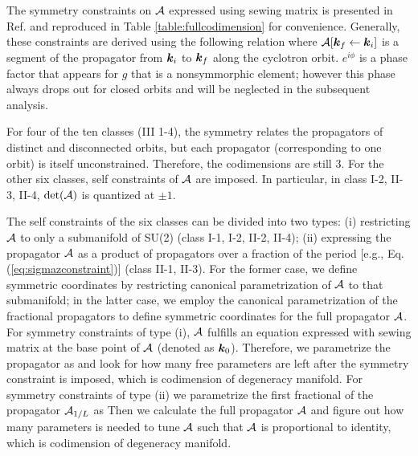 \documentclass[aps, showpacs, twocolumn, notitlepage, superscriptaddress]{revtex4-1}
\begin{document}
The symmetry constraints on ${\cal A}$ expressed using sewing matrix is presented in Ref.  and reproduced in Table \ref{table:fullcodimension} for convenience. Generally, these constraints are derived using the following relation
where ${\cal A}[\boldsymbol{k}_f\leftarrow \boldsymbol{k}_i]$ is a segment of the propagator from $\boldsymbol{k}_i$ to $\boldsymbol{k}_f$ along the cyclotron orbit. $e^{i\phi}$ is a phase factor that appears for $g$ that is a nonsymmorphic element; however this phase always drops out\cite{100p} for closed orbits and will be neglected in the subsequent analysis.

For four of  the ten classes (III 1-4), the symmetry relates the propagators of distinct and disconnected orbits, but each propagator (corresponding to one orbit) is itself unconstrained.  Therefore, the codimensions are still 3. For the other six classes, self constraints of ${\cal A}$ are imposed. In particular, in class I-2, II-3, II-4, $\det({\cal A})$ is quantized at $\pm 1$\cite{topoferm,100p}.

The self constraints of the six classes can be divided into two types: (i) restricting ${\cal A}$ to only a submanifold of SU(2) (class I-1, I-2, II-2, II-4); (ii) expressing the propagator ${\cal A}$ as a product of propagators over a fraction of the period [e.g., Eq. (\ref{eq:sigmazconstraint})] (class II-1, II-3). For the former case, we define symmetric coordinates by restricting canonical parametrization of ${\cal A}$ to that submanifold; in the latter case, we employ the canonical parametrization of the fractional propagators to define symmetric coordinates for the full propagator ${\cal A}$. For symmetry constraints of type (i), ${\cal A}$ fulfills an equation expressed with sewing matrix at the base point of ${\cal A}$ (denoted as $\boldsymbol{k}_0$). Therefore, we parametrize the propagator as
and look for how many free parameters are left after the symmetry constraint is imposed, which is codimension of degeneracy manifold. For symmetry constraints of type (ii) we parametrize the first fractional of the propagator ${\cal A}_{1/L}$ as
Then we calculate the full propagator ${\cal A}$ and figure out how many parameters is needed to tune ${\cal A}$ such that ${\cal A}$ is proportional to identity, which is codimension of degeneracy manifold.
\end{document}
